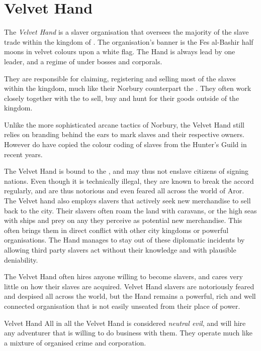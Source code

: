 \section{Velvet Hand}
\label{sec:Velvet Hand}

The \emph{Velvet Hand} is a slaver organisation that oversees the majority of
the slave trade within the kingdom of . The
organisation's banner is the Fes al-Bashir half moons in velvet colours upon a
white flag. The Hand is always lead by one leader, and a regime of under
bosses and corporals.

They are responsible for claiming, registering and selling most of the slaves
within the kingdom, much like their Norbury counterpart the
. They often work closely together with the
 to sell, buy and hunt for their
goods outside of the kingdom.

Unlike the more sophisticated arcane tactics of Norbury, the Velvet Hand still
relies on branding behind the ears to mark slaves and their respective
owners. However do have copied the colour coding of slaves from the Hunter's
Guild in recent years.

The Velvet Hand is bound to the , and may thus not
enslave citizens of signing nations. Even though it is technically illegal,
they are known to break the accord regularly, and are thus notorious and even
feared all across the world of Aror. The Velvet hand also employs slavers that
actively seek new merchandise to sell back to the city. Their slavers often
roam the land with caravans, or the high seas with ships and prey on any they
perceive as potential new merchandise. This often brings them in direct
conflict with other city kingdoms or powerful organisations. The Hand manages
to stay out of these diplomatic incidents by allowing third party slavers act
without their knowledge and with plausible deniability.

The Velvet Hand often hires anyone willing to become slavers, and cares very
little on how their slaves are acquired. Velvet Hand slavers are notoriously
feared and despised all across the world, but the Hand remains a powerful,
rich and well connected organisation that is not easily unseated from their
place of power.

\begin{35e}{Velvet Hand}
  All in all the Velvet Hand is considered \emph{neutral evil}, and will hire
  any adventurer that is willing to do business with them. They operate much
  like a mixture of organised crime and corporation.
\end{35e}
